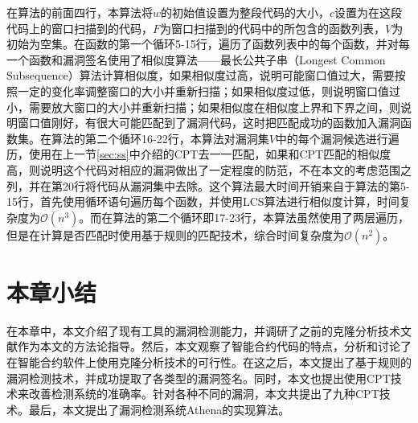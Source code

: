 在算法的前面四行，本算法将$w$的初始值设置为整段代码的大小，$c$设置为在这段代码上的窗口扫描到的代码，$F$为窗口扫描到的代码中的所包含的函数列表，$V$为初始为空集。在函数的第一个循环5-15行，遍历了函数列表中的每个函数，并对每一个函数和漏洞签名使用了相似度算法——最长公共子串（Longest Common Subsequence）算法计算相似度，如果相似度过高，说明可能窗口值过大，需要按照一定的变化率调整窗口的大小并重新扫描；如果相似度过低，则说明窗口值过小，需要放大窗口的大小并重新扫描；如果相似度在相似度上界和下界之间，则说明窗口值刚好，有很大可能匹配到了漏洞代码，这时把匹配成功的函数加入漏洞函数集。在算法的第二个循环16-22行，本算法对漏洞集$V$中的每个漏洞候选进行遍历，使用在上一节\ref{sec:ss}中介绍的CPT去一一匹配，如果和CPT匹配的相似度高，则说明这个代码对相应的漏洞做出了一定程度的防范，不在本文的考虑范围之列，并在第20行将代码从漏洞集中去除。这个算法最大时间开销来自于算法的第5-15行，首先使用循环语句遍历每个函数，并使用LCS算法进行相似度计算，时间复杂度为$\mathcal{O}(n^{3})$。而在算法的第二个循环即17-23行，本算法虽然使用了两层遍历，但是在计算是否匹配时使用基于规则的匹配技术，综合时间复杂度为$\mathcal{O}(n^{2})$。

\section{本章小结}
在本章中，本文介绍了现有工具的漏洞检测能力，并调研了之前的克隆分析技术文献作为本文的方法论指导。然后，本文观察了智能合约代码的特点，分析和讨论了在智能合约软件上使用克隆分析技术的可行性。在这之后，本文提出了基于规则的漏洞检测技术，并成功提取了各类型的漏洞签名。同时，本文也提出使用CPT技术来改善检测系统的准确率。针对各种不同的漏洞，本文共提出了九种CPT技术。最后，本文提出了漏洞检测系统Athena的实现算法。

